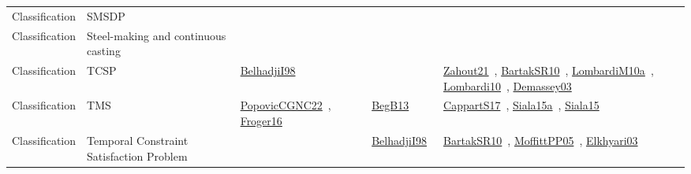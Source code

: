 {\begin{longtable}{lp{3cm}>{\raggedright\arraybackslash}p{6cm}>{\raggedright\arraybackslash}p{6cm}>{\raggedright\arraybackslash}p{8cm}}
Classification & SMSDP &  &  & \\
Classification & Steel-making and continuous casting &  &  & \\
Classification & TCSP & \href{../works/BelhadjiI98.pdf}{BelhadjiI98}~\cite{BelhadjiI98} &  & \href{../works/Zahout21.pdf}{Zahout21}~\cite{Zahout21}, \href{../works/BartakSR10.pdf}{BartakSR10}~\cite{BartakSR10}, \href{../works/LombardiM10a.pdf}{LombardiM10a}~\cite{LombardiM10a}, \href{../works/Lombardi10.pdf}{Lombardi10}~\cite{Lombardi10}, \href{../works/Demassey03.pdf}{Demassey03}~\cite{Demassey03}\\
Classification & TMS & \href{../works/PopovicCGNC22.pdf}{PopovicCGNC22}~\cite{PopovicCGNC22}, \href{../works/Froger16.pdf}{Froger16}~\cite{Froger16} & \href{../works/BegB13.pdf}{BegB13}~\cite{BegB13} & \href{../works/CappartS17.pdf}{CappartS17}~\cite{CappartS17}, \href{../works/Siala15a.pdf}{Siala15a}~\cite{Siala15a}, \href{../works/Siala15.pdf}{Siala15}~\cite{Siala15}\\
Classification & Temporal Constraint Satisfaction Problem &  & \href{../works/BelhadjiI98.pdf}{BelhadjiI98}~\cite{BelhadjiI98} & \href{../works/BartakSR10.pdf}{BartakSR10}~\cite{BartakSR10}, \href{../works/MoffittPP05.pdf}{MoffittPP05}~\cite{MoffittPP05}, \href{../works/Elkhyari03.pdf}{Elkhyari03}~\cite{Elkhyari03}\\

\end{longtable}}
